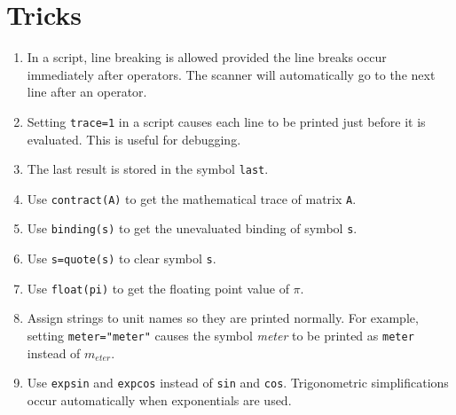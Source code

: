 \section{Tricks}
\begin{enumerate}

\item
In a script, line breaking is allowed provided the line breaks occur immediately after operators.
The scanner will automatically go to the next line after an operator.

\item
Setting \verb$trace=1$ in a script causes each line to be printed just before it is evaluated.
This is useful for debugging.

\item
The last result is stored in the symbol \verb$last$.

\item
Use \verb$contract(A)$ to get the mathematical trace of matrix \verb$A$.

\item
Use \verb$binding(s)$ to get the unevaluated binding of symbol \verb$s$.

\item
Use \verb$s=quote(s)$ to clear symbol \verb$s$.

\item
Use \verb$float(pi)$ to get the floating point value of $\pi$.

\item
Assign strings to unit names so they are printed normally.
For example, setting \verb$meter="meter"$ causes the symbol {\it meter}
to be printed as \verb$meter$ instead of $m_{eter}$.

\item
Use \verb$expsin$ and \verb$expcos$ instead of \verb$sin$ and \verb$cos$.
Trigonometric simplifications occur automatically when exponentials are used.

\end{enumerate}
